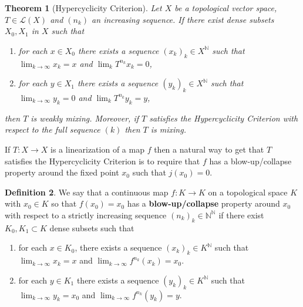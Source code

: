 \documentclass[12pt,english]{amsart}
\numberwithin{equation}{section}
\theoremstyle{plain}
\newtheorem{theorem}{Theorem}[section]
\theoremstyle{definition}
\newtheorem{definition}[theorem]{Definition}
\newcommand{\N}{\mathbb{N}}
\begin{document}
\begin{theorem}[Hypercyclicity Criterion]\label{thm:HC}
Let $X$ be a topological vector space, $T\in \mathcal{L}(X)$ and $(n_k)$ an increasing sequence.
If there exist dense subsets $X_0,X_1$ in $X$ such that
\begin{enumerate}
\item for each $x\in X_0$ there exists a sequence $(x_k)_k\in X^{\mathbb{N}}$ such that $\lim_{k\to \infty} x_k=x$ and $\lim_k T^{n_k}x_{k}=0$,
\item for each $y\in X_1$ there exists a sequence $(y_k)_k\in X^{\mathbb{N}}$ such that $\lim_{k\to \infty} y_k=0$ and $\lim_k T^{n_k}y_{k}=y$,
\end{enumerate}
then $T$ is weakly mixing. Moreover, if $T$ satisfies the Hypercyclicity Criterion with respect to the full sequence $(k)$ then $T$ is mixing.
\end{theorem}

If $T\colon X\to X$ is a linearization of a map $f$ then a natural way to get that $T$ satisfies the Hypercyclicity Criterion is to require that $f$ has a {blow-up/collapse} property around the fixed point $x_0$ such that $j(x_0)=0$.

\begin{definition}\label{BUChcnl}
We say that a continuous map $f\colon K\to K$ on a topological space $K$ with $x_0\in K$ so that $f(x_0)=x_0$ has a \textbf{blow-up/collapse} property around $x_0$ with respect to a strictly increasing sequence $(n_k)_k\in \N^\N$ if there exist $K_0,K_1\subset K$ dense subsets such that
\begin{enumerate}
\item[(i)] for each $x\in K_0$, there exists a sequence $(x_k)_k\in K^{\N}$ such that $\lim_{k\to\infty} x_k=x$ and $\lim_{k\to\infty} f^{n_k}(x_k)=x_0$. 

\item[(ii)] for each $y\in K_1$ there exists a sequence $(y_k)_k\in K^\N$ such that $\lim_{k\to\infty} y_k=x_0$ and $\lim_{k\to\infty} f^{n_k}(y_k)=y$. 
\end{enumerate}
\end{definition}
\end{document}
